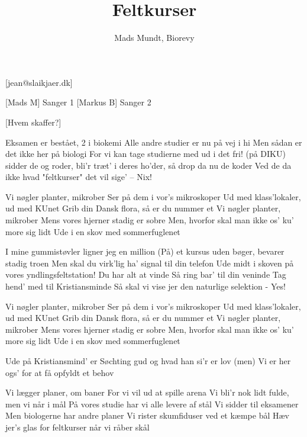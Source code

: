 \documentclass[a4paper,12pt]{article}
\title{Feltkurser}
\author{Mads Mundt, Biorevy}
\begin{document}
\maketitle

\begin{texxers}
	[jean@slaikjaer.dk]
\end{texxers}

\begin{roles}
	[Mads M] Sanger 1
	[Markus B] Sanger 2
\end{roles}


\begin{props}
	[Hvem skaffer?] 
\end{props}

\begin{song}

Eksamen er bestået, 2 i biokemi
Alle andre studier er nu på vej i hi
Men sådan er det ikke her på biologi
For vi kan tage studierne med ud i det fri!
(på DIKU) sidder de og roder, 
bli'r træt' i deres ho'der, 
så drop da nu de koder
Ved de da ikke hvad "feltkurser" det vil sige' -- Nix!

Vi nøgler planter, mikrober
Ser på dem i vor's mikroskoper
Ud med klass'lokaler, ud med KUnet
Grib din Dansk flora, så er du nummer et
Vi nøgler planter, mikrober
Mens vores hjerner stadig er sobre
Men, hvorfor skal man ikke os' ku' more sig lidt
Ude i en skov med sommerfuglenet

I mine gummistøvler ligner jeg en million
(På) et kursus uden bøger, bevarer stadig troen
Men skal du virk'lig ha' signal til din telefon
Ude midt i skoven på vores yndlingsfeltstation! 
 Du har alt at vinde
Så ring bar' til din veninde
Tag hend' med til Kristiansminde
Så skal vi vise jer den naturlige selektion - Yes!

Vi nøgler planter, mikrober
Ser på dem i vor's mikroskoper
Ud med klass'lokaler, ud med KUnet
Grib din Dansk flora, så er du nummer et
Vi nøgler planter, mikrober
Mens vores hjerner stadig er sobre
Men, hvorfor skal man ikke os' ku' more sig lidt
Ude i en skov med sommerfuglenet

Ude på Kristiansmind' er Søchting gud og hvad han si'r er
lov (men)
Vi er her ogs' for at få opfyldt et behov

Vi lægger planer, om baner
For vi vil ud at spille arena
Vi bli'r nok lidt fulde, men vi når i mål
På vores studie har vi alle levere af stål
 Vi sidder til eksamener
Men biologerne har andre planer
Vi rister skumfiduser ved et kæmpe bål
 Hæv jer's glas for feltkurser når vi råber skål



\end{song}
\end{document}

